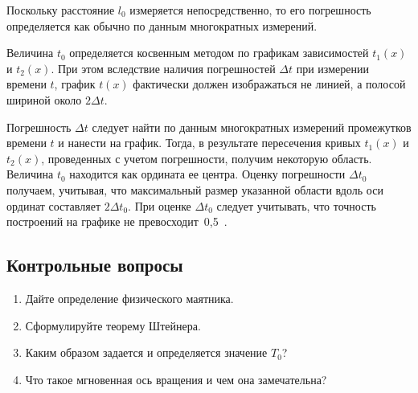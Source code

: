 \documentclass[a4paper, 12pt]{extarticle}
\begin{document}
Поскольку расстояние $l_0$ измеряется непосредственно, то его погрешность определяется как обычно по данным многократных измерений.

Величина $t_0$ определяется косвенным методом по графикам зависимостей $t_1(x)$ и $t_2(x)$.  При этом вследствие наличия погрешностей $\Delta t$ при измерении времени $t$, график $t(x)$ фактически должен изображаться не линией, а полосой шириной около $2 \Delta t$. %

Погрешность $\Delta t$ следует найти по данным многократных измерений промежутков времени $t$ и нанести на график. Тогда, в результате пересечения  кривых $t_1(x)$ и $t_2(x)$, проведенных с учетом погрешности, получим некоторую область. Величина $t_0$ находится как ордината ее центра. Оценку погрешности $\Delta t_0$ получаем, учитывая, что максимальный размер указанной области вдоль оси ординат составляет $2 \Delta t_0$. При оценке $\Delta t_0$ следует учитывать, что точность построений на графике не превосходит~0,5~. %

\subsection{Контрольные вопросы}
\begin{enumerate}
\item Дайте определение физического маятника.
\item Сформулируйте теорему Штейнера.
\item Каким образом задается и определяется значение $T_0$?
\item Что такое мгновенная ось вращения и чем она замечательна?
\end{enumerate}
\end{document}
